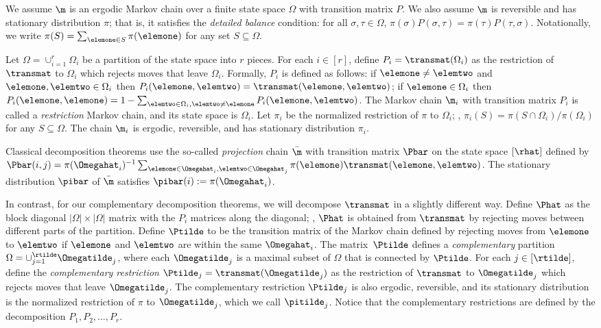 \documentclass{toc}
\begin{document}
We assume $\m$ is an ergodic Markov chain over a finite state space 
$\Omega$ with transition matrix $P$. We also assume $\m$ is reversible 
and has stationary distribution $\pi$; that is, it 
satisfies the \emph{detailed balance} condition: for all 
$\sigma,\tau\in\Omega$, 
$\pi(\sigma)P(\sigma,\tau)=\pi(\tau)P(\tau,\sigma)$.  Notationally, 
we write $\pi(S) = \sum_{\elemone\in S} \pi(\elemone)$ for any set 
$S\subseteq \Omega$.

Let $\Omega = \cup_{i=1}^{r} \Omega_i$ be a partition of the state 
space into $r$ pieces.  For each $i \in [r]$, define $P_{i} = 
\transmat(\Omega_i)$ as the restriction of $\transmat$ to $\Omega_i$ 
which rejects moves that leave $\Omega_i$.  
Formally, $P_{i}$ is defined as 
follows: if $\elemone \not= \elemtwo$ and $\elemone,\elemtwo \in 
\Omega_i$ then $P_i(\elemone,\elemtwo)=\transmat(\elemone,\elemtwo)$; 
if $\elemone \in \Omega_i$ then 
$P_i(\elemone,\elemone)=1-\sum_{\elemtwo \in \Omega_i, \elemtwo \not= 
  \elemone} P_i(\elemone,\elemtwo)$.  The Markov chain $\m_i$ with transition matrix $P_i$ is called a \emph{restriction} Markov chain, and its state space is $\Omega_i$.
Let $\pi_i$ be the normalized restriction of 
$\pi$ to $\Omega_i$; \ie,  $\pi_i(S)=\pi(S\cap\Omega_i)/\pi(\Omega_i)$ 
for any $S \subseteq \Omega$.  The chain $\m_i$ is ergodic, 
reversible, and has stationary distribution $\pi_i$.

Classical decomposition theorems use the so-called \emph{projection} chain $\bar{\m}$
with transition matrix $\Pbar$ on the state space $[\rhat]$ defined by 
$\Pbar(i,j)=\pi(\Omegahat_i)^{-1}\sum_{{\elemone\in\Omegahat_i,}{\elemtwo
\in \Omegahat_j}} \pi(\elemone)\transmat(\elemone,\elemtwo)$.
The stationary distribution $\pibar$ of $\bar{\m}$ satisfies $\pibar(i) := 
\pi(\Omegahat_i)$. 

In contrast, for our complementary decomposition theorems,
we will decompose $\transmat$ in a slightly different way.
Define $\Phat$ as the block diagonal $|\Omega|\times |\Omega|$ matrix 
with the $P_i$ matrices along the diagonal; \ie,  $\Phat$ is 
obtained from $\transmat$ by rejecting moves between different parts of 
the partition.
Define $\Ptilde$ to be the transition matrix of the 
Markov chain defined by rejecting moves from $\elemone$ to $\elemtwo$ 
if $\elemone$ and $\elemtwo$ are within the same $\Omegahat_i$.  
The matrix~$\Ptilde$ 
defines a \emph{complementary} partition $\Omega = \cup_{j=1}^{\rtilde} 
\Omegatilde_j$, where each $\Omegatilde_j$ is a maximal subset of 
$\Omega$ that is connected 
by $\Ptilde$. For each $j\in [\rtilde]$, define the \emph{complementary 
restriction} $\Ptilde_{j} = \transmat(\Omegatilde_j)$ as the 
restriction of $\transmat$ to $\Omegatilde_j$ which rejects moves that 
leave $\Omegatilde_j$. The complementary restriction $\Ptilde_j$ is 
also ergodic, reversible, and its stationary distribution is the normalized restriction 
of $\pi$ to $\Omegatilde_j$, which we call $\pitilde_j$.
Notice that 
the complementary restrictions are defined by the decomposition 
$P_1,P_2,\ldots, P_r$.
\end{document}
